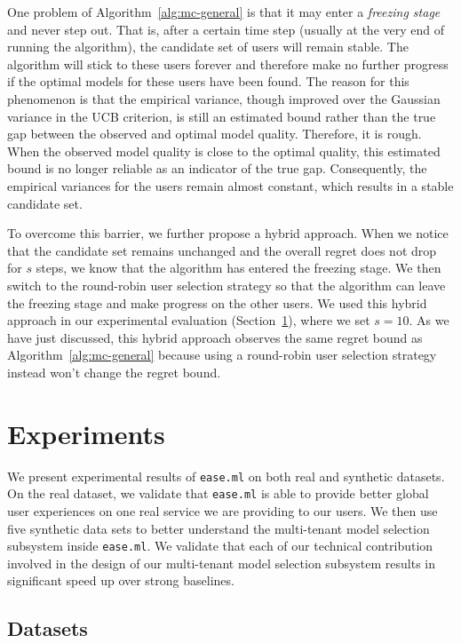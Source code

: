 \documentclass[letterpaper]{vldb}
\newcommand{\eml}{\texttt{ease.ml}\xspace}
\begin{document}
One problem of Algorithm~\ref{alg:mc-general} is that it may enter a \emph{freezing stage} and never step out.
That is, after a certain time step (usually at the very end of running the algorithm), the candidate set of users will remain stable.
The algorithm will stick to these users forever and therefore make no further progress if the optimal models for these users have been found.
The reason for this phenomenon is that the empirical variance, though improved over the Gaussian variance in the UCB criterion, is still an estimated bound rather than the true gap between the observed and optimal model quality.
Therefore, it is rough. When the observed model quality is close to the optimal quality, this estimated bound is no longer reliable as an indicator of the true gap.
Consequently, the empirical variances for the users remain almost constant, which results in a stable candidate set.

To overcome this barrier, we further propose a hybrid approach.
When we notice that the candidate set remains unchanged and the overall regret does not drop for $s$ steps,
we know that the algorithm has entered the freezing stage.
We then switch to the round-robin user selection strategy so that the algorithm can leave the freezing stage and make progress on the other users.
We used this hybrid approach in our experimental evaluation (Section~\ref{sec:experiments}), where we set $s=10$.
As we have just discussed, this hybrid approach observes the same regret bound as Algorithm~\ref{alg:mc-general} because using a round-robin user selection strategy instead won't change the regret bound.



\newpage

\section{Experiments}\label{sec:experiments}

We present experimental results of 
\eml on both real and synthetic datasets.
On the real dataset, we validate that
\eml is able to provide
better global user experiences on one
real service we are providing to our users. 
We then use five synthetic data sets
to better understand the multi-tenant model
selection subsystem inside \eml. We validate
that each of our technical contribution 
involved in the design of our 
multi-tenant model selection subsystem
results in significant speed up
over strong baselines.

\subsection{Datasets}
\end{document}
